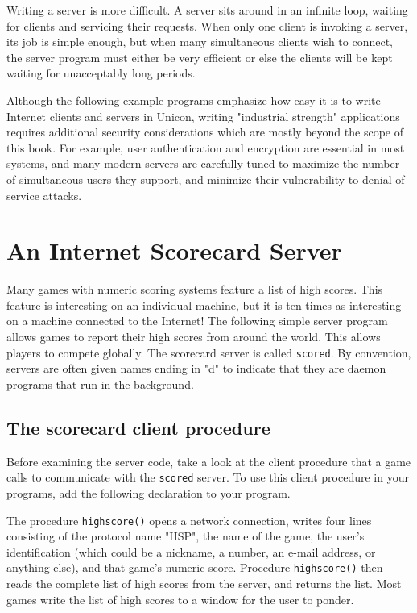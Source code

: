 Writing a server is more difficult. A server sits around in
an infinite loop, waiting for clients and servicing their requests.
When only one client is invoking a server, its job is simple enough,
but when many simultaneous clients wish to connect, the server program
must either be very efficient or else the clients will be kept waiting
for unacceptably long periods.

Although the following example programs emphasize how easy it is to
write Internet clients and servers in Unicon, writing
"industrial strength" applications requires
additional security considerations which are mostly beyond the scope of
this book. For example, user authentication and encryption are
essential in most systems, and many modern servers are carefully tuned
to maximize the number of simultaneous users they support, and minimize
their vulnerability to denial-of-service attacks.

\section{An Internet Scorecard Server}

Many games with numeric scoring systems feature a list of high scores.
This feature is interesting on an individual machine, but it is ten
times as interesting on a machine connected to the Internet! The
following simple server program allows games to report
their high scores from around the world. This allows players to compete
globally. The scorecard server is called \texttt{scored}. By
convention, servers are often given names ending in
"d" to indicate that they are daemon
programs that run in the background.

\subsection{The scorecard client procedure}

Before examining the server code, take a look at the client procedure
that a game calls to communicate with the \texttt{scored} server. To
use this client procedure in your programs, add the following
declaration to your program.


The procedure \texttt{highscore()} opens a network connection, writes
four lines consisting of the protocol name
"HSP", the name of the game, the
user's identification (which could be a nickname, a
number, an e-mail address, or anything else), and that
game's numeric score. Procedure \texttt{highscore()}
then reads the complete list of high scores from the server, and
returns the list. Most games write the list of high scores to a window
for the user to ponder.


